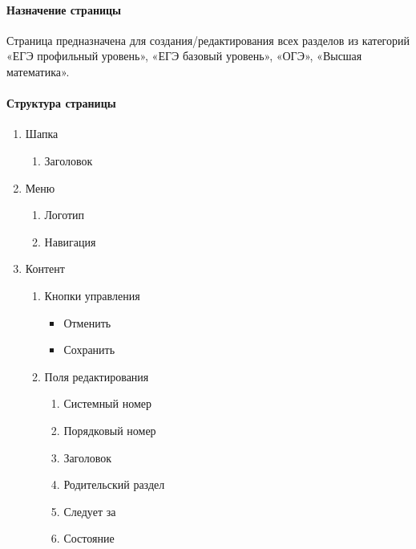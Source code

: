 \paragraph{Назначение страницы}
Страница предназначена для создания/редактирования всех разделов из категорий «ЕГЭ профильный уровень», «ЕГЭ базовый уровень», «ОГЭ», «Высшая математика».

\paragraph{Структура страницы}
\begin{enumerate}
    \item Шапка
    \begin{enumerate}
        \item Заголовок
    \end{enumerate}

    \item Меню
    \begin{enumerate}
        \item Логотип
        \item Навигация
    \end{enumerate}

    \item Контент
    \begin{enumerate}
        \item Кнопки управления
        \begin{itemize}
            \item Отменить
            \item Сохранить
        \end{itemize}

        \item Поля редактирования
        \begin{enumerate}
            \item Системный номер
            \item Порядковый номер
            \item Заголовок
            \item Родительский раздел
            \item Следует за
            \item Состояние
        \end{enumerate}
    \end{enumerate}
\end{enumerate}

